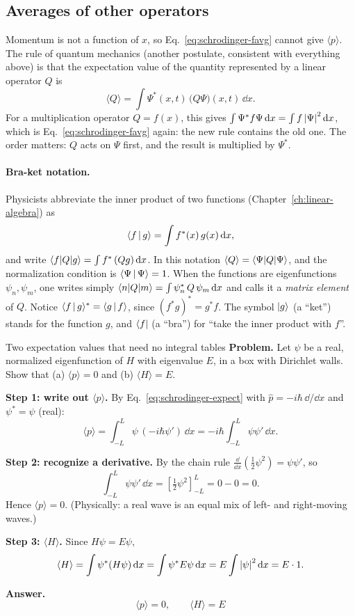 \subsection{Averages of other operators}

Momentum is not a function of $x$, so Eq.~\eqref{eq:schrodinger-favg} cannot give $\langle p\rangle$. The rule of quantum mechanics (another postulate, consistent with everything above) is that the expectation value of the quantity represented by a linear operator $Q$ is
\begin{equation}
\langle Q\rangle=\int\Psi^*(x,t)\,\big(Q\Psi\big)(x,t)\,\dd x.
\label{eq:schrodinger-expect}
\end{equation}
For a multiplication operator $Q=f(x)$, this gives $\int\Psi^*f\Psi\,\mathrm{d} x=\int f\left\lvert \Psi\right\rvert^2\mathrm{d} x$, which is Eq.~\eqref{eq:schrodinger-favg} again: the new rule contains the old one. The order matters: $Q$ acts on $\Psi$ first, and the result is multiplied by $\Psi^*$.

\paragraph{Bra-ket notation.} Physicists abbreviate the inner product of two functions (Chapter~\ref{ch:linear-algebra}) as
\begin{equation}
\langle f\,|\,g\rangle=\int f^*(x)\,g(x)\,\mathrm{d} x,
\label{eq:schrodinger-braket}
\end{equation}
and write $\langle f|Q|g\rangle=\int f^*\,(Qg)\,\mathrm{d} x$. In this notation $\langle Q\rangle=\langle \Psi| Q|\Psi\rangle$, and the normalization condition is $\langle \Psi\,|\,\Psi\rangle=1$. When the functions are eigenfunctions $\psi_n,\psi_m$, one writes simply $\langle n|Q|m\rangle=\int\psi_n^*\,Q\,\psi_m\,\mathrm{d} x$ and calls it a \emph{matrix element} of $Q$. Notice $\langle f\,|\,g\rangle^*=\langle g\,|\,f\rangle$, since $(f^*g)^*=g^*f$. The symbol $|g\rangle$ (a ``ket'') stands for the function $g$, and $\langle f|$ (a ``bra'') for ``take the inner product with $f$''.

\begin{sample}{Two expectation values that need no integral tables}
\textbf{Problem.} Let $\psi$ be a real, normalized eigenfunction of $H$ with eigenvalue $E$, in a box with Dirichlet walls. Show that (a) $\langle p\rangle=0$ and (b) $\langle H\rangle=E$.

\textbf{Step 1: write out $\langle p\rangle$.} By Eq.~\eqref{eq:schrodinger-expect} with $\hat p=-i\hbar\,\dd/\dd x$ and $\psi^*=\psi$ (real):
\[
\langle p\rangle=\int_{-L}^L\psi\,(-i\hbar\psi')\,\dd x=-i\hbar\int_{-L}^L\psi\psi'\,\dd x.
\]

\textbf{Step 2: recognize a derivative.} By the chain rule $\frac{\dd}{\dd x}\left(\tfrac12\psi^2\right)=\psi\psi'$, so
\[
\int_{-L}^L\psi\psi'\,\dd x=\left[\tfrac12\psi^2\right]_{-L}^{L}=0-0=0.
\]
Hence $\langle p\rangle=0$. (Physically: a real wave is an equal mix of left- and right-moving waves.)

\textbf{Step 3: $\langle H\rangle$.} Since $H\psi=E\psi$,
\[
\langle H\rangle=\int\psi^*(H\psi)\,\mathrm{d} x=\int\psi^*E\psi\,\mathrm{d} x=E\int\left\lvert \psi\right\rvert^2\mathrm{d} x=E\cdot1.
\]

\textbf{Answer.} \[\boxed{\langle p\rangle=0,\qquad \langle H\rangle=E}\]
\end{sample}

